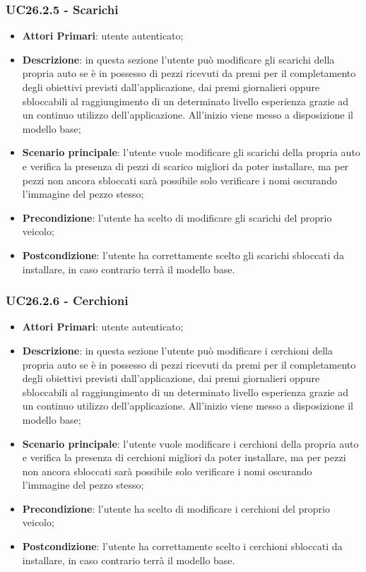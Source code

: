 \subsubsection{UC26.2.5 - Scarichi}
\begin{itemize}
	\item \textbf{Attori Primari}: utente autenticato;
	\item \textbf{Descrizione}: in questa sezione l'utente può modificare gli scarichi della propria auto se è in possesso di pezzi ricevuti da premi per il completamento degli obiettivi previsti dall'applicazione, dai premi giornalieri oppure sbloccabili al raggiungimento di un determinato livello esperienza grazie ad un continuo utilizzo dell'applicazione.
	All'inizio viene messo a disposizione il modello base;
	\item \textbf{Scenario principale}: l'utente vuole modificare gli scarichi della propria auto e verifica la presenza di pezzi di scarico migliori da poter installare, ma per pezzi non ancora sbloccati sarà possibile solo verificare i nomi oscurando l'immagine del pezzo stesso;
	\item \textbf{Precondizione}: l'utente ha scelto di modificare gli scarichi del proprio veicolo; 
	\item \textbf{Postcondizione}: l'utente ha correttamente scelto gli scarichi sbloccati da installare, in caso contrario terrà il modello base.
\end{itemize}
\subsubsection{UC26.2.6 - Cerchioni}
\begin{itemize}
	\item \textbf{Attori Primari}: utente autenticato;
	\item \textbf{Descrizione}: in questa sezione l'utente può modificare i cerchioni della propria auto se è in possesso di pezzi ricevuti da premi per il completamento degli obiettivi previsti dall'applicazione, dai premi giornalieri oppure sbloccabili al raggiungimento di un determinato livello esperienza grazie ad un continuo utilizzo dell'applicazione.
	All'inizio viene messo a disposizione il modello base;
	\item \textbf{Scenario principale}: l'utente vuole modificare i cerchioni della propria auto e verifica la presenza di cerchioni migliori da poter installare, ma per pezzi non ancora sbloccati sarà possibile solo verificare i nomi oscurando l'immagine del pezzo stesso;
	\item \textbf{Precondizione}: l'utente ha scelto di modificare i cerchioni del proprio veicolo; 
	\item \textbf{Postcondizione}: l'utente ha correttamente scelto i cerchioni sbloccati da installare, in caso contrario terrà il modello base.
\end{itemize} 
